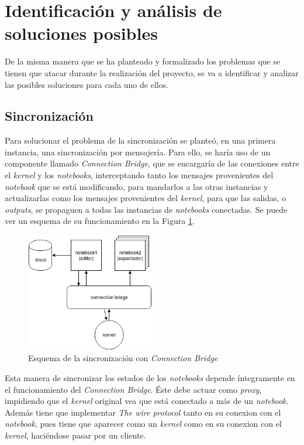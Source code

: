\documentclass[11pt,spanish,listoffigures]{tfgetsinf}
\begin{document}

\section{Identificación y análisis de soluciones posibles}
\label{sec:ident-soluciones}

De la misma manera que se ha planteado y formalizado los problemas que se tienen que atacar durante la realización del proyecto, se va a identificar y analizar las posibles soluciones para cada uno de ellos. 


\subsection{Sincronización}
\label{subsec:sincro}

Para solucionar el problema de la sincronización se planteó, en una primera instancia, una sincronización por mensajería. Para ello, se haría uso de un componente llamado \textit{Connection Bridge}, que se encargaría de las conexiones entre el \textit{kernel} y los \textit{notebooks}, interceptando tanto los mensajes provenientes del \textit{notebook} que se está modificando, para mandarlos a las otras instancias y actualizarlas como los mensajes provenientes del \textit{kernel}, para que las salidas, o \textit{outputs}, se propaguen a todas las instancias de \textit{notebooks} conectadas. Se puede ver un esquema de su funcionamiento en la Figura \ref{fig:cb-scheme}.

\begin{figure}[h]
	\centering
  	\includegraphics[width=0.5\textwidth]{Connection_Bridge.png}
  	\caption{Esquema de la sincronización con \textit{Connection Bridge}}
  	\label{fig:cb-scheme}
\end{figure}

Esta manera de sincronizar los estados de los \textit{notebooks} depende íntegramente en el funcionamiento del \textit{Connection Bridge}. Éste debe actuar como \textit{proxy}, impidiendo que el \textit{kernel} original vea que está conectado a más de un \textit{notebook}. Además tiene que implementar \textit{The wire protocol} \cite{wire-protocol} tanto en su conexion con el \textit{notebook}, pues tiene que aparecer como un \textit{kernel} como en su conexion con el \textit{kernel}, haciéndose pasar por un cliente. 
\end{document}
